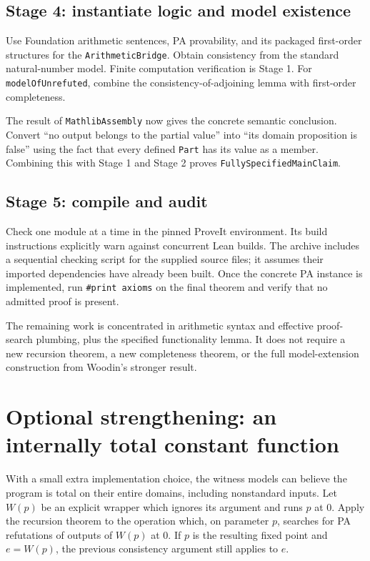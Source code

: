 \documentclass[11pt]{article}
\theoremstyle{definition}
\theoremstyle{remark}
\begin{document}
\subsection{Stage 4: instantiate logic and model existence}

Use Foundation arithmetic sentences, PA provability, and its packaged
first-order structures for the \texttt{ArithmeticBridge}. Obtain
consistency from the standard natural-number model. Finite computation
verification is Stage 1. For \texttt{modelOfUnrefuted}, combine the
consistency-of-adjoining lemma with first-order completeness.

The result of \texttt{MathlibAssembly} now gives the concrete semantic
conclusion. Convert ``no output belongs to the partial value'' into
``its domain proposition is false'' using the fact that every defined
\texttt{Part} has its value as a member. Combining this with Stage 1 and
Stage 2 proves \texttt{FullySpecifiedMainClaim}.

\subsection{Stage 5: compile and audit}

Check one module at a time in the pinned ProveIt environment. Its build
instructions explicitly warn against concurrent Lean builds. The
archive includes a sequential checking script for the supplied source
files; it assumes their imported dependencies have already been built.
Once the concrete PA instance is implemented, run \texttt{\#print axioms}
on the final theorem and verify that no admitted proof is present.

The remaining work is concentrated in arithmetic syntax and effective
proof-search plumbing, plus the specified functionality lemma. It does
not require a new recursion theorem, a new completeness theorem, or the
full model-extension construction from Woodin's stronger result.

\section{Optional strengthening: an internally total constant function}

With a small extra implementation choice, the witness models can believe
the program is total on their entire domains, including nonstandard
inputs. Let $W(p)$ be an explicit wrapper which ignores its argument and
runs $p$ at $0$. Apply the recursion theorem to the operation which, on
parameter $p$, searches for PA refutations of outputs of $W(p)$ at $0$.
If $p$ is the resulting fixed point and $e=W(p)$, the previous
consistency argument still applies to $e$.
\end{document}
